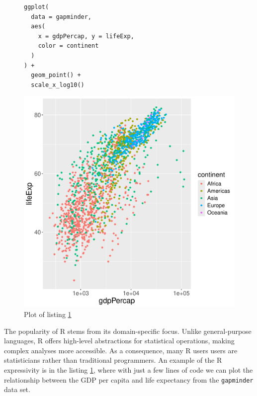 \begin{figure}[H]
	\centering
	\begin{minipage}{0.45\textwidth}
		\centering
		\begin{verbatim}
ggplot(
  data = gapminder,
  aes(
    x = gdpPercap, y = lifeExp,
    color = continent
  )
) +
  geom_point() +
  scale_x_log10()
    \end{verbatim}
		\label{lst:motivation}
	\end{minipage}%
	\hfill
	\begin{minipage}{0.45\textwidth}
		\centering
		\includegraphics[width=\textwidth]{figures/motivation-Rplots.pdf}
		\caption{Plot of listing \ref{lst:motivation}}
	\end{minipage}
\end{figure}

The popularity of R stems from its domain-specific focus. Unlike general-purpose languages, R offers high-level abstractions for statistical operations, making complex analyses more accessible. As a consequence, many R users users are statisticians rather than traditional programmers. An example of the R expressivity is in the listing \ref{lst:motivation}, where with just a few lines of code we can plot the relationship between the GDP per capita and life expectancy from the \texttt{gapminder} data set\cite{gapminder}.

